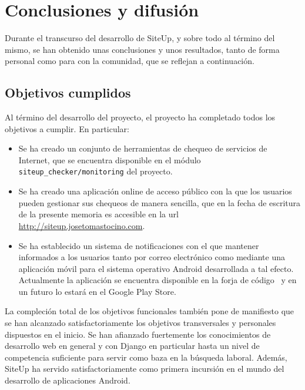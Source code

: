 \documentclass[a4paper,12pt]{article}
\begin{document}





\section{Conclusiones y difusión}

Durante el transcurso del desarrollo de SiteUp, y sobre todo al término del
mismo, se han obtenido unas conclusiones y unos resultados, tanto de forma
personal como para con la comunidad, que se reflejan a continuación.

\subsection{Objetivos cumplidos}
Al término del desarrollo del proyecto, el proyecto ha completado todos los
objetivos a cumplir. En particular:

\begin{itemize}
\item Se ha creado un conjunto de herramientas de chequeo de servicios de
  Internet, que se encuentra disponible en el módulo
  \texttt{siteup\_checker/monitoring} del proyecto.
\item Se ha creado una aplicación online de acceso público con la que los
  usuarios pueden gestionar sus chequeos de manera sencilla, que en la fecha de
  escritura de la presente memoria es accesible en la url
  \url{http://siteup.josetomastocino.com}.
\item Se ha establecido un sistema de notificaciones con el que mantener
  informados a los usuarios tanto por correo electrónico como mediante una
  aplicación móvil para el sistema operativo Android desarrollada a tal
  efecto. Actualmente la aplicación se encuentra disponible en la forja de
  código~\cite{forja} y en un futuro lo estará en el Google Play Store.
\end{itemize}

La compleción total de los objetivos funcionales también pone de manifiesto que
se han alcanzado satisfactoriamente los objetivos transversales y personales
dispuestos en el inicio. Se han afianzado fuertemente los conocimientos de
desarrollo web en general y con Django en particular hasta un nivel de
competencia suficiente para servir como baza en la búsqueda laboral. Además,
SiteUp ha servido satisfactoriamente como primera incursión en el mundo del
desarrollo de aplicaciones Android.
\end{document}
